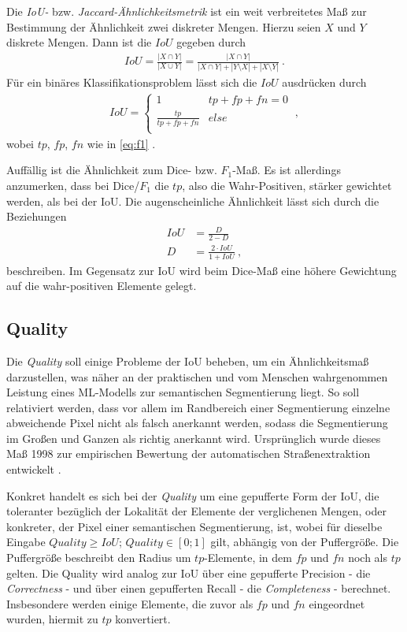 Die \textit{\acf{IoU}-} bzw. \textit{Jaccard-Ähnlichkeitsmetrik} ist ein weit verbreitetes Maß zur Bestimmung der Ähnlichkeit zwei diskreter Mengen. Hierzu seien $X$ und $Y$ diskrete Mengen. Dann ist die $IoU$ gegeben durch 
\begin{align}
	\label{eq:iou} IoU = \frac{|X\cap Y|}{|X \cup Y|} = \frac{| X \cap Y |}{| X \cap Y | + |Y \setminus X| + |X \setminus Y|}~.
\end{align} 
Für ein binäres Klassifikationsproblem lässt sich die $IoU$ ausdrücken durch 
\begin{align}
	\label{eq:iou-binary} IoU = \begin{cases}
		1 & tp + fp + fn = 0 \\ 
		\frac{tp}{tp + fp + fn} & else \\
	\end{cases}~,
\end{align}
wobei $tp$, $fp$, $fn$ wie in \autoref{eq:f1} \cite{Fletcher.2018}. 

Auffällig ist die Ähnlichkeit zum Dice- bzw. $F_{1}$-Maß. Es ist allerdings anzumerken, dass bei Dice/$F_1$ die $tp$, also die Wahr-Positiven, stärker gewichtet werden, als bei der \ac{IoU}. Die augenscheinliche Ähnlichkeit lässt sich durch die Beziehungen
\begin{align}
	\label{eq:dice-iou} IoU &= \frac{D}{2 - D} \\
	D &= \frac{2 \cdot IoU}{1 + IoU} ~,
\end{align}
beschreiben.
Im Gegensatz zur \ac{IoU} wird beim Dice-Maß eine höhere Gewichtung auf die wahr-positiven Elemente 
gelegt.

\subsection{Quality} \label{sec:evaluation-metrics:quality}

Die \textit{Quality} soll einige Probleme der \ac{IoU} beheben, um ein Ähnlichkeitsmaß darzustellen, 
was näher an der praktischen und vom Menschen wahrgenommen Leistung eines \ac{ML}-Modells zur semantischen Segmentierung liegt.
So soll relativiert werden, dass vor allem im Randbereich einer Segmentierung einzelne abweichende Pixel
nicht als falsch anerkannt werden, sodass die Segmentierung im Großen und Ganzen als richtig anerkannt wird. 
Ursprünglich wurde dieses Maß 1998 zur empirischen Bewertung der automatischen Straßenextraktion entwickelt \cite{ChristianWiedemann.1998}. 

Konkret handelt es sich bei der \textit{Quality} um eine gepufferte Form der \ac{IoU},
die toleranter bezüglich der Lokalität der Elemente der verglichenen Mengen, oder konkreter,
der Pixel einer semantischen Segmentierung, ist, 
wobei für dieselbe Eingabe $Quality \geq IoU$; $Quality \in [0;1]$ gilt, abhängig von der Puffergröße. 
Die Puffergröße beschreibt den Radius um $tp$-Elemente, in dem $fp$ und $fn$ noch als $tp$ gelten.   
Die Quality wird analog zur \ac{IoU} über eine gepufferte Precision - die \textit{Correctness} - 
und über einen gepufferten Recall - die \textit{Completeness} - berechnet. Insbesondere werden einige Elemente, 
die zuvor als $fp$ und $fn$ eingeordnet wurden, hiermit zu $tp$ konvertiert.

